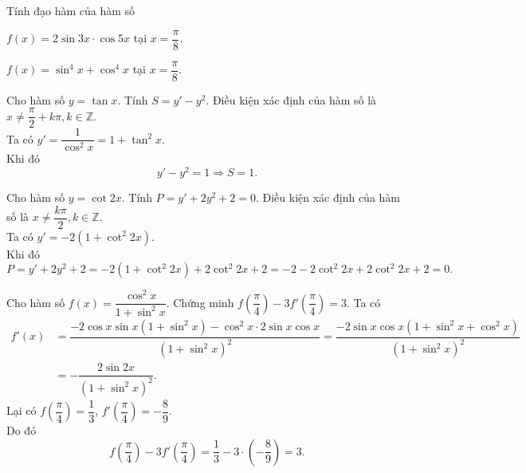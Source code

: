 \begin{bt}%
Tính đạo hàm của hàm số
\begin{listEX}[1]
\item $f(x)=2\sin 3x\cdot\cos 5x$ tại $x=\dfrac{\pi}{8}$.
\item $f(x)=\sin^4x+\cos^4x$ tại $x=\dfrac{\pi}{8}$.
\end{listEX}
\end{bt}

\begin{bt}%
	Cho hàm số $y=\tan x$. Tính $S=y'-y^2$.
	\loigiai
	{
		Điều kiện xác định của hàm số là $x\neq \dfrac{\pi}{2}+k\pi, k\in \mathbb{Z}$.\\
		Ta có $y'=\dfrac{1}{\cos^2 x}=1+\tan^2 x$.\\
		Khi đó
		\[y'-y^2 = 1\Rightarrow S=1.\]
			}
\end{bt}

\begin{bt}%
Cho hàm số $y=\cot 2x$. Tính $P=y'+2y^2+2=0$.
	\loigiai
	{
		Điều kiện xác định của hàm số là $x\neq \dfrac{k\pi}{2}, k\in \mathbb{Z}$.\\
		Ta có $y'=-2\left(1+\cot^2 2x\right)$.\\
		Khi đó
		\[P=y'+2y^2+2 = -2\left(1+\cot^2 2x\right)+2\cot^2 2x+2 = -2-2\cot^2 2x+2\cot^2 2x+2 = 0.\]
			}
\end{bt}

\begin{bt}%
Cho hàm số $f(x)=\dfrac{\cos^2 x}{1+\sin^2 x}$. Chứng minh $f\left(\dfrac{\pi}{4}\right)-3f'\left(\dfrac{\pi}{4}\right)=3$.
	\loigiai
	{
		Ta có
		\begin{align*}
		f'(x) &=\dfrac{-2\cos x\sin x\left(1+\sin^2 x\right)-\cos^2 x\cdot 2\sin x\cos x}{\left(1+\sin^2 x\right)^2} = \dfrac{-2\sin x\cos x\left(1+\sin^2 x+\cos^2 x\right)}{\left(1+\sin^2 x\right)^2}\\
		&=-\dfrac{2\sin 2x}{\left(1+\sin^2 x\right)^2}.
		\end{align*}
		Lại có $f\left(\dfrac{\pi}{4}\right)=\dfrac{1}{3}$, $f'\left(\dfrac{\pi}{4}\right)=-\dfrac{8}{9}$.\\
		Do đó
		\[f\left(\dfrac{\pi}{4}\right)-3f'\left(\dfrac{\pi}{4}\right) = \dfrac{1}{3}-3\cdot \left(-\dfrac{8}{9}\right) = 3.\]
	}
\end{bt}

